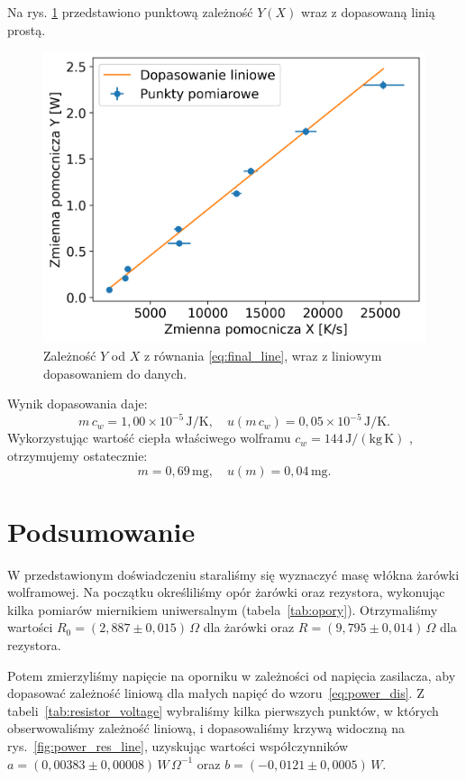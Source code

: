 \documentclass[12pt]{article}
\begin{document}
Na rys. \ref{fig:final_graph} przedstawiono punktową zależność $Y(X)$ wraz z dopasowaną linią prostą.
\begin{figure}[H]
    \centering
    \includegraphics[scale=0.7]{final_graph}
    \caption{Zależność $Y$ od $X$ z równania \eqref{eq:final_line}, wraz z liniowym dopasowaniem do danych.}
    \label{fig:final_graph}
\end{figure}
Wynik dopasowania daje:
\[
    m\,c_w = 1{,}00 \times 10^{-5}\,\mathrm{J/K}, 
    \quad
    u(m\,c_w) = 0{,}05\times 10^{-5}\,\mathrm{J/K}.
\]
Wykorzystując wartość ciepła właściwego wolframu $c_w = 144\,\mathrm{J/(kg\,K)}$ \cite{skrypt}, otrzymujemy ostatecznie:
\[
    m =0{,}69\,\mathrm{mg},
    \quad
    u(m) = 0{,}04\,\mathrm{mg}.
\]

\newpage

\section{Podsumowanie}
W przedstawionym doświadczeniu staraliśmy się wyznaczyć masę włókna żarówki wolframowej. Na początku określiliśmy opór żarówki oraz rezystora, wykonując kilka pomiarów miernikiem uniwersalnym (tabela~\ref{tab:opory}). Otrzymaliśmy wartości $R_{0} = (2{,}887 \pm 0{,}015)\,\Omega$ dla żarówki oraz $R = (9{,}795 \pm 0{,}014)\,\Omega$ dla rezystora.

Potem zmierzyliśmy napięcie na oporniku w zależności od napięcia zasilacza, aby dopasować zależność liniową dla małych napięć do wzoru~\ref{eq:power_dis}. Z tabeli~\ref{tab:resistor_voltage} wybraliśmy kilka pierwszych punktów, w których obserwowaliśmy zależność liniową, i dopasowaliśmy krzywą widoczną na rys.~\ref{fig:power_res_line}, uzyskując wartości współczynników $a=(0{,}00383 \pm 0{,}00008)\,W\,\Omega^{-1}$ oraz $b=(-0{,}0121 \pm 0{,}0005)\,W$.
\end{document}
